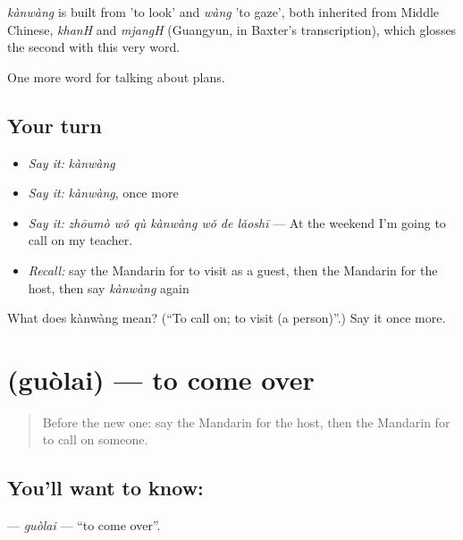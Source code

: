 \begin{cousinweb}
\emph{kànwàng} is built from  'to look' and \emph{wàng} 'to gaze', both inherited from Middle Chinese, \emph{khanH} and \emph{mjangH} (Guangyun, in Baxter's transcription), which glosses the second with this very word.
\end{cousinweb}

\begin{grammarlens}[title={What you've built}]
One more word for talking about plans.
\end{grammarlens}

\subsection*{Your turn}
\begin{itemize}
\raggedright
  \item \emph{Say it:} \emph{kànwàng}
  \item \emph{Say it:} \emph{kànwàng}, once more
  \item \emph{Say it:} \emph{zhōumò wǒ qù kànwàng wǒ de lǎoshī} — At the weekend I'm going to call on my teacher.
  \item \emph{Recall:} say the Mandarin for to visit as a guest, then the Mandarin for the host, then say \emph{kànwàng} again
\end{itemize}

\begin{tcolorbox}[breakable,colback=teal!4,colframe=teal!35!black,title={Before you move on}]
What does kànwàng mean? (\textquotedblleft{}To call on; to visit (a person)\textquotedblright{}.) Say it once more.
\end{tcolorbox}
\section[\texorpdfstring{\zh{过来} (guòlai)}{过来 (guòlai)}]{ (guòlai) — to come over}

\label{lesson:ZH-C180-guolai}



\begin{quote}
Before the new one: say the Mandarin for the host, then the Mandarin for to call on someone.
\end{quote}

\subsection*{You'll want to know: }
\textbf{} — \emph{guòlai} — \textquotedblleft{}to come over\textquotedblright{}.

